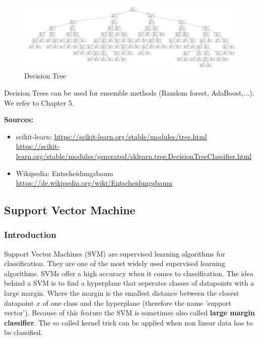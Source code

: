 \begin{figure}[hbtp]
	\centering
	\includegraphics[scale=0.5]{tree}
	\caption{Decision Tree}
	\label{fig:Datensatz - unbearbeitet}
\end{figure}


Decision Trees can be used for ensemble methods (Random forest, AdaBoost,...). We refer to Chapter 5.

\textbf{Sources:}
\begin{itemize}
\item scikit-learn: \hyperlink{https://scikit-learn.org/stable/modules/tree.html}{https://scikit-learn.org/stable/modules/tree.html} \\
\hyperlink{https://scikit-learn.org/stable/modules/generated/sklearn.tree.DecisionTreeClassifier.html}{https://scikit-learn.org/stable/modules/generated/sklearn.tree.DecisionTreeClassifier.html}
\item Wikipedia: Entscheidungsbaum \hyperlink{https://de.wikipedia.org/wiki/Entscheidungsbaum}{https://de.wikipedia.org/wiki/Entscheidungsbaum}
\end{itemize}

\subsection{Support Vector Machine}
\subsubsection{Introduction}

Support Vector Machines (SVM) are supervised learning algorithms for classification.
They are one of the most widely used supervised learning algorithms. 
SVMs offer a high accuracy when it comes to classification.
The idea behind a SVM is to find a hyperplane that seperates classes of datapoints with a large margin. Where the margin is the smallest distance between the closest datapoint $x$ of one class and the hyperplane (therefore the name 'support vector'). Because of this feature the SVM is sometimes also called \textbf{large margin classifier}.
The so called kernel trick can be applied when non linear data has to be classified.

